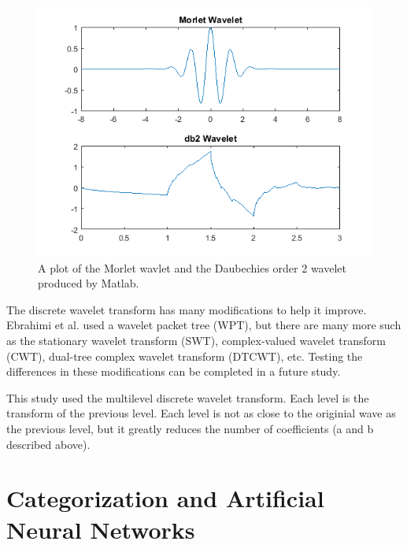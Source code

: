 \documentclass[12pt, oneside]{book}
\begin{document}
\begin{figure}[H]
	\centering
	\includegraphics[]{morletvsdb2.png}
	\caption{A plot of the Morlet wavlet and the Daubechies order 2 wavelet produced by Matlab.}
	\label{fig:mvd}
\end{figure}

The discrete wavelet transform has many modifications to help it improve. Ebrahimi et al. \cite{ebrahimi_automatic_2008} used a wavelet packet tree (WPT), but there are many more such as the stationary wavelet transform (SWT), complex-valued wavelet transform (CWT), dual-tree complex wavelet transform (DTCWT), etc. Testing the differences in these modifications can be completed in a future study. 

This study used the multilevel discrete wavelet transform. Each level is the transform of the previous level. Each level is not as close to the originial wave as the previous level, but it greatly reduces the number of coefficients (a and b described above).



\section{\textbf{Categorization and Artificial Neural Networks}}
\end{document}
